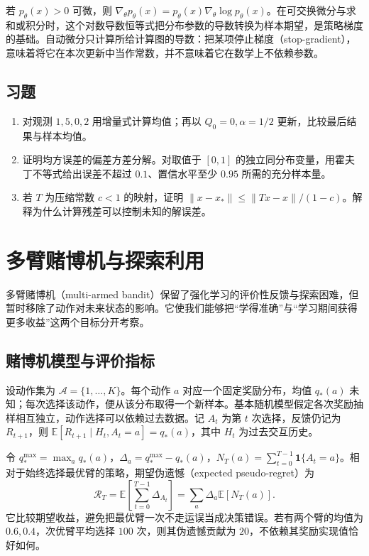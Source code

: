\documentclass[UTF8,12pt,a4paper,fontset=fandol]{ctexbook}
\begin{document}
若 $p_\theta(x)>0$ 可微，则 $\nabla_\theta p_\theta(x)=p_\theta(x)\nabla_\theta\log p_\theta(x)$。在可交换微分与求和或积分时，这个对数导数恒等式把分布参数的导数转换为样本期望，是策略梯度的基础。自动微分只计算所给计算图的导数：把某项停止梯度（stop-gradient），意味着将它在本次更新中当作常数，并不意味着它在数学上不依赖参数。

\section{习题}
\begin{enumerate}
\item 对观测 $1,5,0,2$ 用增量式计算均值；再以 $Q_0=0,\alpha=1/2$ 更新，比较最后结果与样本均值。
\item 证明均方误差的偏差方差分解。对取值于 $[0,1]$ 的独立同分布变量，用霍夫丁不等式给出误差不超过 $0.1$、置信水平至少 $0.95$ 所需的充分样本量。
\item 若 $T$ 为压缩常数 $c<1$ 的映射，证明 $\|x-x_*\|\leq\|Tx-x\|/(1-c)$。解释为什么计算残差可以控制未知的解误差。
\end{enumerate}

\chapter{多臂赌博机与探索利用}
\label{ch:rl-bandits}

多臂赌博机（multi-armed bandit）保留了强化学习的评价性反馈与探索困难，但暂时移除了动作对未来状态的影响。它使我们能够把“学得准确”与“学习期间获得更多收益”这两个目标分开考察。

\section{赌博机模型与评价指标}

设动作集为 $\mathcal A=\{1,\ldots,K\}$。每个动作 $a$ 对应一个固定奖励分布，均值 $q_*(a)$ 未知；每次选择该动作，便从该分布取得一个新样本。基本随机模型假定各次奖励抽样相互独立，动作选择可以依赖过去数据。记 $A_t$ 为第 $t$ 次选择，反馈仍记为 $R_{t+1}$，则 $\mathbb E[R_{t+1}\mid H_t,A_t=a]=q_*(a)$，其中 $H_t$ 为过去交互历史。

令 $q_*^{\max}=\max_a q_*(a)$，$\Delta_a=q_*^{\max}-q_*(a)$，$N_T(a)=\sum_{t=0}^{T-1}\mathbf1\{A_t=a\}$。相对于始终选择最优臂的策略，期望伪遗憾（expected pseudo-regret）为
\begin{equation}
\mathcal R_T=\mathbb E\!\left[\sum_{t=0}^{T-1}\Delta_{A_t}\right]
=\sum_a\Delta_a\mathbb E[N_T(a)].
\label{eq:rl-bandit-regret}
\end{equation}
它比较期望收益，避免把最优臂一次不走运误当成决策错误。若有两个臂的均值为 $0.6,0.4$，次优臂平均选择 $100$ 次，则其伪遗憾贡献为 $20$，不依赖其奖励实现值恰好如何。
\end{document}
